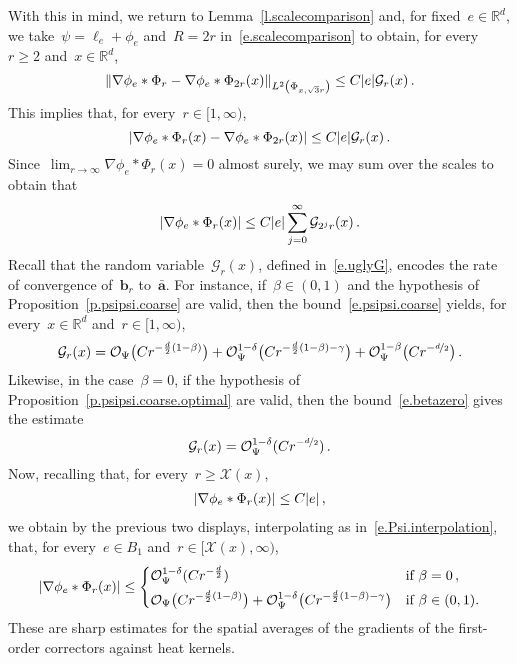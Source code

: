 \documentclass[11pt,twoside]{article} %
\numberwithin{equation}{section}
\theoremstyle{definition}
\let\originalleft\left
\let\originalright\right
\renewcommand{\left}{\mathopen{}\mathclose\bgroup\originalleft}
\renewcommand{\right}{\aftergroup\egroup\originalright}
\newcommand*{\Rd}{\ensuremath{\mathbb{R}^d}}
\renewcommand{\b}{\ensuremath{\mathbf{b}}}
\renewcommand{\a}{\mathbf{a}}
\newcommand{\ahom}{\bar{\a}}
\newcommand{\X}{\mathcal{X}}
\renewcommand{\O}{\mathcal{O}}
\begin{document}
\smallskip

With this in mind, we return to Lemma~\ref{l.scalecomparison} and, for fixed~$e\in\Rd$, we take~$\psi = \ell_e + \phi_e$ and~$R=2r$ in~\eqref{e.scalecomparison} to obtain, for every~$r\geq 2$ and~$x\in\Rd$,
\begin{equation}
\label{e.conv.rto2r.0}
\left\| \nabla \phi_e \ast \Phi_r  - \nabla \phi_e \ast \Phi_{2r}(x)\right\|_{L^2 \left( \Phi_{x,\sqrt{3}r} \right)} 
\leq 
C |e| \mathcal{G}_r(x) \,. 
\end{equation}
This implies that, for every~$r \in [1,\infty)$, 
\begin{equation}
\label{e.conv.rto2r}
\left| \nabla \phi_e \ast \Phi_r (x) - \nabla \phi_e \ast \Phi_{2r}(x)\right| 
\leq 
C |e| \mathcal{G}_r(x) \,. 
\end{equation}
Since~$\lim_{r\to \infty} \nabla \phi_e \ast \Phi_r (x) = 0$ almost surely, we may sum over the scales to obtain that 
\begin{equation}
\label{e.conv.r}
\left| \nabla \phi_e \ast \Phi_r (x) \right| 
\leq 
C |e| \sum_{j=0}^\infty \mathcal{G}_{2^jr}(x) \,. 
\end{equation}
Recall that the random variable~$\mathcal{G}_r(x)$, defined in~\eqref{e.uglyG}, encodes the rate of convergence of~$\b_r$ to~$\ahom$. For instance, if~$\beta\in (0,1)$ and the hypothesis of Proposition~\ref{p.psipsi.coarse} are valid, then the bound~\eqref{e.psipsi.coarse} yields, for every~$x\in\Rd$ and~$r \in [1,\infty)$, 
\begin{equation}
\label{e.uglyG.bound}
\mathcal{G}_r(x)
=
\O_{\Psi} \bigl( C r^{-\frac d2(1-\beta)} \bigr) 
+ 
\O_{\Psi}^{1-\delta} \bigl( C r^{-\frac d2(1-\beta) - \gamma} \bigr)
+
\O_{\Psi}^{1-\beta} \bigl( C r^{-\nicefrac d2} \bigr)
\,.
\end{equation}
Likewise, in the case~$\beta=0$, if the hypothesis of Proposition~\ref{p.psipsi.coarse.optimal} are valid, then the bound~\eqref{e.betazero} gives the estimate
\begin{equation}
\label{e.uglyG.bound.betazero}
\mathcal{G}_r(x)
=
\O_{\Psi}^{1-\delta} (C r^{-\nicefrac d2})
\,.
\end{equation}
Now, recalling that, for every~$r \geq \X(x)$, 
\begin{align*}  
\left| \nabla \phi_e \ast \Phi_r (x) \right|  \leq C|e| \,,
\end{align*}
we obtain by the previous two displays, interpolating as in~\eqref{e.Psi.interpolation}, 
that, for every~$e \in B_1$ and~$r \in [\X(x),\infty)$, 
\begin{equation}
\label{e.nablacorr.r}
\left| \nabla \phi_e \ast \Phi_r (x) \right| 
\leq 
\left\{
\begin{aligned}
& \O_{\Psi}^{1-\delta} (C   r^{-\frac d2}) & \mbox{if} & \ \beta = 0\,,\\
&\O_{\Psi} \bigl( C    r^{-\frac d2(1-\beta)} \bigr) + \O_{\Psi}^{1-\delta} \bigl( C r^{-\frac d2(1-\beta) - \gamma} \bigr)
 & \mbox{if} & \ \beta\in (0,1).
\end{aligned}
\right.
\end{equation}
These are sharp estimates for the spatial averages of the gradients of the first-order correctors against heat kernels. 
\end{document}
